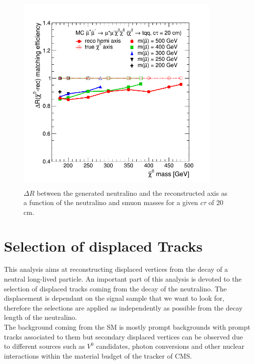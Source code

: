 \documentclass{cernatlasnote}
\begin{document}
\begin{figure}[ht]
\centering
\includegraphics[height=10cm, width=10cm, trim= 0cm 0cm 0cm 0.cm,clip]{images/Topology/eff_dR_trueaxis.png}
\caption{\label{fig:AXESQUALITY} $\Delta R$ between the generated neutralino and the reconstructed axis as a function of the neutralino and smuon masses for a given $c\tau$ of 20 cm.}
\end{figure}

\FloatBarrier
\newpage
\section{Selection of displaced Tracks}
\label{SEC: DISTRK}
    
This analysis aims at reconstructing displaced vertices from the decay of a neutral long-lived particle. An important part of this analysis is devoted to the selection of displaced tracks coming from the decay of the neutralino. The displacement is dependant on the signal sample that we want to look for, therefore the selections are  applied as independently as possible from the decay length of the neutralino.\\

The background coming from the SM is mostly prompt backgrounds with prompt tracks associated to them but secondary displaced vertices can be observed due to different sources such as $V^0$ candidates, photon conversions and other nuclear interactions within the material budget of the tracker of CMS.
\end{document}

